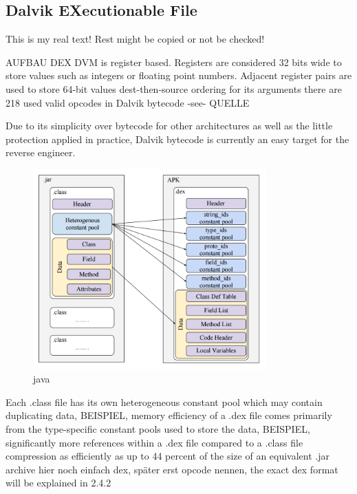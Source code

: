 \subsection{Dalvik EXecutionable File} \label{subsection:android-dalvik}
This is my real text! Rest might be copied or not be checked!

%
AUFBAU DEX
DVM is register based. Registers are considered 32 bits wide to store values such as integers or floating point numbers. Adjacent register pairs are used to store 64-bit values\newline
dest-then-source ordering for its arguments\newline
there are 218 used valid opcodes in Dalvik bytecode -see- QUELLE \newline

Due to its simplicity over bytecode for other architectures as well as the little protection applied in practice, Dalvik bytecode is currently an easy target for the reverse engineer.

\begin{figure}[h]
    \centering
    \includegraphics[width=0.8\textwidth]{data/java.png}
    \caption{java}
    \label{fig:java}
\end{figure}

Each .class file has its own heterogeneous constant pool which may contain duplicating data, BEISPIEL, memory efficiency of a .dex file comes primarily from the type-specific constant pools used to store the data, BEISPIEL,\newline
significantly more references within a .dex file compared to a .class file\cite{ehringerDalvik}\newline
compression as efficiently as up to 44 percent of the size of an equivalent .jar archive\cite{ehringerDalvik}\newline
hier noch einfach dex, später erst opcode nennen, the exact dex format will be explained in 2.4.2\newline

